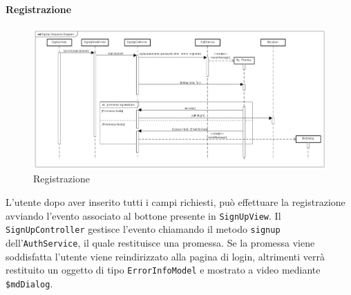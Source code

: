 \paragraph{Registrazione}

\label{Registrazione}

\begin{figure}[ht]
	\centering
	\includegraphics[scale=0.4,keepaspectratio]{UML/DiagrammiDiSequenza/Front-end/SignUp.png}
	\caption{Registrazione}
\end{figure} \FloatBarrier

L'utente dopo aver inserito tutti i campi richiesti, può effettuare la registrazione avviando l'evento associato al bottone presente in \texttt{SignUpView}. Il \texttt{SignUpController} gestisce l'evento chiamando il metodo \texttt{signup} dell'\texttt{AuthService}, il quale restituisce una promessa. Se la promessa viene soddisfatta l'utente viene reindirizzato alla pagina di login, altrimenti verrà restituito un oggetto di tipo \texttt{ErrorInfoModel} e mostrato a video mediante \texttt{\$mdDialog}.
